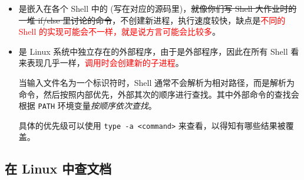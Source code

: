 \documentclass{article}
\begin{document}
	\begin{itemize}
		\itemsep0pt
		\item {}是嵌入在各个 Shell 中的 (写在对应的源码里)，\sout{就像你们写 Shell 大作业时的一堆 if/else 里讨论的命令}，\textcolor{green!80!black}{不创建新进程，执行速度较快}，缺点是\textcolor{red}{不同的 Shell 的实现可能会不一样，就是说方言可能会比较多}。
		\item {}是 Linux 系统中独立存在的外部程序，\textcolor{green!80!black}{由于是外部程序，因此在所有 Shell 看来表现几乎一样}，\textcolor{red}{调用时会创建新的子进程}。

			当输入文件名为一个标识符时，Shell 通常不会解析为相对路径，而是解析为命令，然后按照内部优先，外部其次的顺序进行查找。其中外部命令的查找会根据 \texttt{PATH} 环境变量\textit{按顺序依次查找}。

			具体的优先级可以使用 \texttt{type -a <command>} 来查看，以得知有哪些结果被覆盖。
	\end{itemize}

	\subsection{在 Linux 中查文档}
	\label{sss:linuxdoc}
\end{document}
